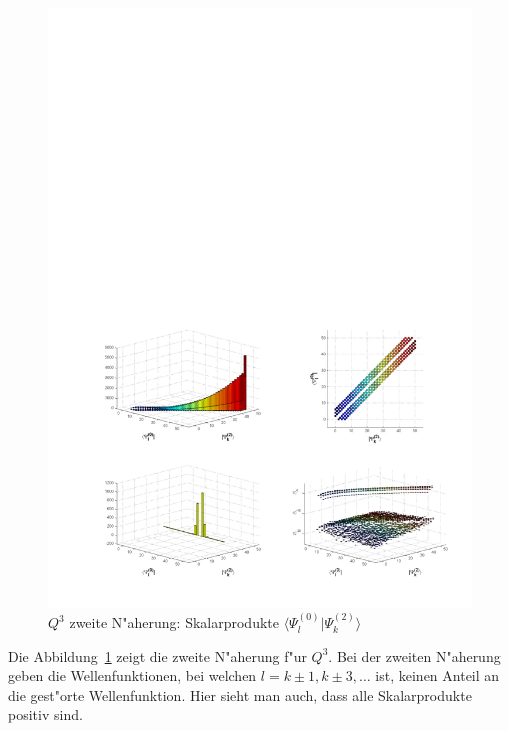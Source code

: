 \begin{refsection}
\begin{figure}	%
\centering
\includegraphics[width=1.0\textwidth]{anharmonisch/images/x3/Stoerung2Skalare.pdf}
\caption{$Q^3$ zweite N"aherung: Skalarprodukte $\langle\Psi_l^{(0)}|\Psi_k^{(2)}\rangle$ 
\label{skript:x3_Stoerung2Skalare}}
\end{figure}

Die Abbildung~\ref{skript:x3_Stoerung2Skalare} zeigt die zweite N"aherung f"ur $Q^3$.
Bei der zweiten N"aherung geben die Wellenfunktionen,
bei welchen $l=k\pm 1,k\pm 3,\dots$ ist,
keinen Anteil an die gest"orte Wellenfunktion.
Hier sieht man auch, dass alle Skalarprodukte positiv sind.


\end{refsection}
